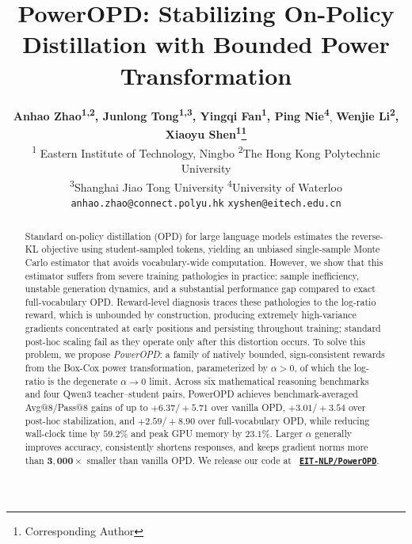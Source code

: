 \documentclass[11pt]{article}
\title{PowerOPD: Stabilizing On-Policy Distillation with Bounded Power Transformation}
\author{
  \textbf{Anhao Zhao\textsuperscript{1,2},
  Junlong Tong\textsuperscript{1,3},
  Yingqi Fan\textsuperscript{1},
  Ping Nie\textsuperscript{4}},
  \textbf{Wenjie Li\textsuperscript{2},
  Xiaoyu Shen\textsuperscript{1}\thanks{Corresponding Author}}
  \\
  \textsuperscript{1} Eastern Institute of Technology, Ningbo
  \quad
  \textsuperscript{2}The Hong Kong Polytechnic University
  \\
  \textsuperscript{3}Shanghai Jiao Tong University
  \quad
  \textsuperscript{4}University of Waterloo
  \\
  {\texttt{anhao.zhao@connect.polyu.hk}\quad
  \texttt{xyshen@eitech.edu.cn}}
}
\begin{document}
\maketitle
\begin{abstract}
Standard on-policy distillation (OPD) for large language models estimates the reverse-KL objective using student-sampled tokens, yielding an unbiased single-sample Monte Carlo estimator that avoids vocabulary-wide computation. However, we show that this estimator suffers from severe training pathologies in practice: sample inefficiency, unstable generation dynamics, and a substantial performance gap compared to exact full-vocabulary OPD.
Reward-level diagnosis traces these pathologies to the log-ratio reward, which is unbounded by construction, producing extremely high-variance gradients concentrated at early positions and persisting throughout training; standard post-hoc scaling fail as they operate only after this distortion occurs.
To solve this problem, we propose \emph{PowerOPD}: a family of natively bounded, sign-consistent rewards from the Box-Cox power transformation, parameterized by $\alpha > 0$, of which the log-ratio is the degenerate $\alpha \to 0$ limit.
Across six mathematical reasoning benchmarks and four Qwen3 teacher--student pairs, PowerOPD achieves benchmark-averaged Avg@8/Pass@8 gains of up to $\mathbf{+6.37/+5.71}$ over vanilla OPD, $\mathbf{+3.01/+3.54}$ over post-hoc stabilization, and $\mathbf{+2.59/+8.90}$ over full-vocabulary OPD, while reducing wall-clock time by $59.2\%$ and peak GPU memory by $23.1\%$.
Larger $\alpha$ generally improves accuracy, consistently shortens responses, and keeps gradient norms more than $\mathbf{3{,}000\times}$ smaller than vanilla OPD.
We release our code at \textcolor{githubblue}{\faGithub}\ \href{https://github.com/EIT-NLP/PowerOPD}{\textbf{\texttt{EIT-NLP/PowerOPD}}}.
\end{abstract}
 
\end{document}
